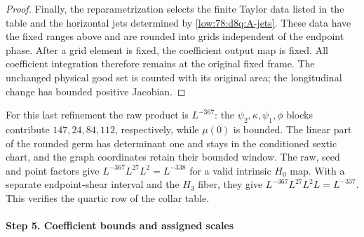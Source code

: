 \documentclass[11pt]{amsart}
\theoremstyle{definition}
\theoremstyle{remark}
\numberwithin{equation}{section}
\begin{document}
\begin{proof}
Finally, the reparametrization selects the finite Taylor data listed in the table and the horizontal jets determined by \eqref{low:78:d8q:A-jets}. These data have the fixed ranges above and are rounded into grids independent of the endpoint phase. After a grid element is fixed, the coefficient output map is fixed. All coefficient integration therefore remains at the original fixed frame. The unchanged physical good set is counted with its original area; the longitudinal change has bounded positive Jacobian.
\end{proof}

For this last refinement the raw product is $L^{-367}$: the $\psi_2,\kappa,\psi_1,\phi$ blocks contribute $147,24,84,112$, respectively, while $\mu(0)$ is bounded. The linear part of the rounded germ has determinant one and stays in the conditioned sextic chart, and the graph coordinates retain their bounded window. The raw, seed and point factors give $L^{-367}L^{27}L^2=L^{-338}$ for a valid intrinsic $H_0$ map. With a separate endpoint-shear interval and the $H_3$ fiber, they give $L^{-367}L^{27}L^2L=L^{-337}$. This verifies the quartic row of the collar table.

\paragraph{Step 5. Coefficient bounds and assigned scales}
\end{document}
